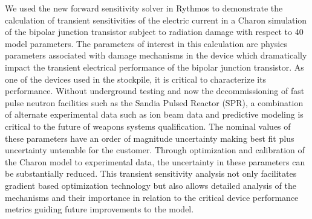 \documentclass[pdf,ps2pdf,11pt]{SANDreport}
\begin{document}
We used the new forward sensitivity solver in Rythmos to demonstrate the
calculation of transient sensitivities of the electric current in a Charon
simulation of the bipolar junction transistor subject to radiation damage
with respect to 40 model parameters.  The parameters of interest in this 
calculation are physics parameters associated
with damage mechanisms in the device which dramatically impact the transient
electrical performance of the bipolar junction transistor.  As one of the 
devices used in the stockpile, it is critical to characterize its performance.
Without underground testing and now the decommissioning of fast pulse
neutron facilities such as the Sandia Pulsed Reactor (SPR), a combination of
alternate experimental data such as ion beam data and predictive modeling
is critical to the future of weapons systems qualification.  The nominal values
of these parameters have an order of magnitude uncertainty making best fit
plus uncertainty untenable for the customer.  Through optimization and calibration
of the Charon model to experimental data, the uncertainty in these parameters
can be substantially reduced.  This transient sensitivity analysis not only
facilitates gradient based optimization technology but also allows detailed
analysis of the mechanisms and their importance in relation to the critical
device performance metrics guiding future improvements to the model.
\end{document}
